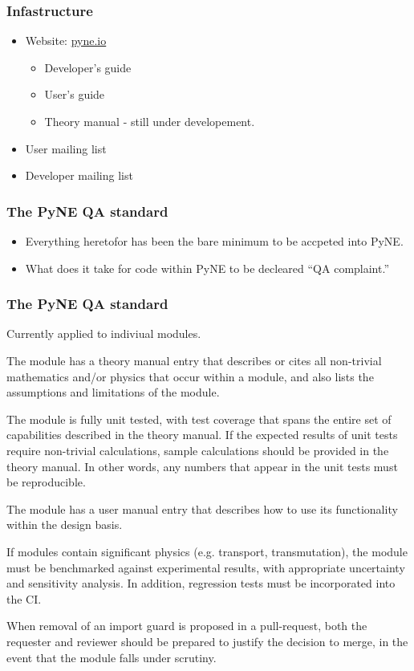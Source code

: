 \documentclass[12pt]{beamer}
\begin{document}
\begin{frame}
\frametitle{Infastructure}
\begin{itemize}
\item{Website: \url{pyne.io}}
\begin{itemize}
\item{Developer's guide}
\item{User's guide}
\item{Theory manual - still under developement.}
\end{itemize}
\item{User mailing list}
\item{Developer mailing list}
\end{itemize}

\end{frame}


\begin{frame}
\frametitle{The PyNE QA standard}

\begin{itemize}
\item{Everything heretofor has been the bare minimum to be accpeted into PyNE.}
\item{What does it take for code within PyNE to be decleared ``QA complaint.''}
\end{itemize}

\end{frame}

\begin{frame}
\frametitle{The PyNE QA standard}

Currently applied to indiviual modules.

The module has a theory manual entry that describes or cites all non-trivial mathematics and/or physics that occur within a module, and also lists the assumptions and limitations of the module.

The module is fully unit tested, with test coverage that spans the entire set of capabilities described in the theory manual. If the expected results of unit tests require non-trivial calculations, sample calculations should be provided in the theory manual. In other words, any numbers that appear in the unit tests must be reproducible.

The module has a user manual entry that describes how to use its functionality within the design basis.

If modules contain significant physics (e.g. transport, transmutation), the module must be benchmarked against experimental results, with appropriate uncertainty and sensitivity analysis. In addition, regression tests must be incorporated into the CI.

When removal of an import guard is proposed in a pull-request, both the requester and reviewer should be prepared to justify the decision to merge, in the event that the module falls under scrutiny.

\end{frame}
\end{document}
